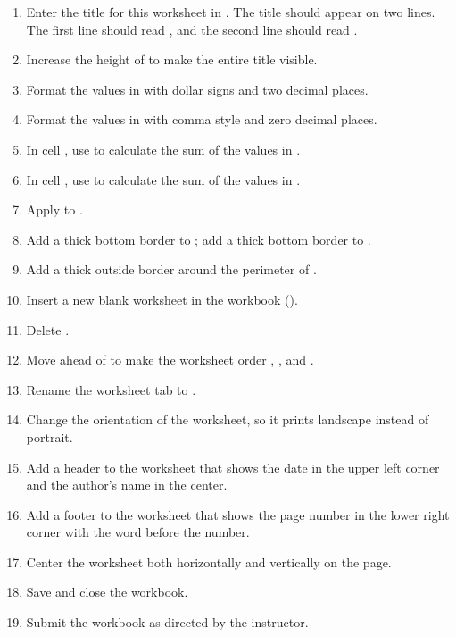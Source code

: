 \begin{enumbox}
\begin{enumerate}
		\item Enter the title for this worksheet in . The title should appear on two lines. The first line should read , and the second line should read .
		\item Increase the height of  to make the entire title visible.
		\item Format the values in  with dollar signs and two decimal places.
		\item Format the values in  with comma style and zero decimal places.
		\item In cell , use  to calculate the sum of the values in .
		\item In cell , use  to calculate the sum of the values in .
		\item Apply  to .
		\item Add a thick bottom border to ; add a thick bottom border to .
		\item Add a thick outside border around the perimeter of .
		\item Insert a new blank worksheet in the workbook ().
		\item Delete .
		\item Move  ahead of  to make the worksheet order , , and .
		\item Rename the  worksheet tab to .
		\item Change the orientation of the  worksheet, so it prints landscape instead of portrait.
		\item Add a header to the  worksheet that shows the date in the upper left corner and the author's name in the center.
		\item Add a footer to the  worksheet that shows the page number in the lower right corner with the word  before the number.
		\item Center the worksheet both horizontally and vertically on the page.
		\item Save and close the  workbook.
		\item Submit the  workbook as directed by the instructor.
	\end{enumerate}
\end{enumbox}